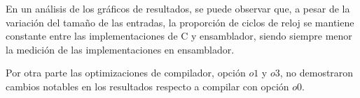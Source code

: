 \par En un análisis de los gráficos de resultados, se puede observar que, a pesar de la variación del tamaño de las entradas, la proporción de ciclos de reloj se mantiene constante entre las implementaciones de C y ensamblador, siendo siempre menor la medición de las implementaciones en ensamblador.%

\par Por otra parte las optimizaciones de compilador, opción $o1$ y $o3$, no demostraron cambios notables en los resultados respecto a compilar con opción $o0$.
